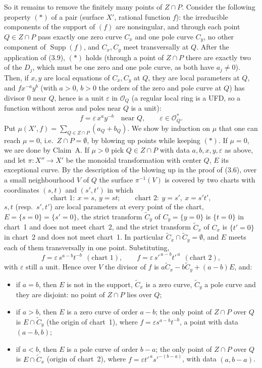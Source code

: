\documentclass[11pt]{article}
\begin{document}
So it remains to remove the finitely many points of $Z\cap P$. Consider the following property $(\ast)$ of a pair (surface $X'$, rational function $f$): the irreducible components of the support of $(f)$ are nonsingular, and through each point $Q\in Z\cap P$ pass exactly one zero curve $C_x$ and one pole curve $C_y$, no other component of $\operatorname{Supp}(f)$, and $C_x,C_y$ meet transversally at $Q$. After the application of (3.9), $(\ast)$ holds (through a point of $Z\cap P$ there are exactly two of the $D_j$, which must be one zero and one pole curve, as both have $a_j\ne 0$). Then, if $x,y$ are local equations of $C_x,C_y$ at $Q$, they are local parameters at $Q$, and $f x^{-a}y^{b}$ (with $a>0$, $b>0$ the orders of the zero and pole curve at $Q$) has divisor $0$ near $Q$, hence is a unit $\varepsilon$ in $\mathcal O_{Q}$ (a regular local ring is a UFD, so a function without zeros and poles near $Q$ is a unit):
\[
f=\varepsilon\,x^{a}y^{-b}\quad\text{near }Q,\qquad \varepsilon\in\mathcal O_{Q}^*.
\]
Put $\mu(X',f)=\sum_{Q\in Z\cap P}(a_Q+b_Q)$. We show by induction on $\mu$ that one can reach $\mu=0$, i.e.\ $Z\cap P=\emptyset$, by blowing up points while keeping $(\ast)$. If $\mu=0$, we are done by Claim~A. If $\mu>0$ pick $Q\in Z\cap P$ with data $a,b,x,y,\varepsilon$ as above, and let $\pi:X''\to X'$ be the monoidal transformation with center $Q$, $E$ its exceptional curve. By the description of the blowing up in the proof of (3.6), over a small neighbourhood $V$ of $Q$ the surface $\pi^{-1}(V)$ is covered by two charts with coordinates $(s,t)$ and $(s',t')$ in which
\[
\text{chart }1:\ x=s,\ y=st;\qquad \text{chart }2:\ y=s',\ x=s't' ,
\]
$s,t$ (resp.\ $s',t'$) are local parameters at every point of the chart, $E=\{s=0\}=\{s'=0\}$, the strict transform $\widetilde C_y$ of $C_y=\{y=0\}$ is $\{t=0\}$ in chart~1 and does not meet chart~2, and the strict transform $\widetilde C_x$ of $C_x$ is $\{t'=0\}$ in chart~2 and does not meet chart~1. In particular $\widetilde C_x\cap\widetilde C_y=\emptyset$, and $E$ meets each of them transversally in one point. Substituting,
\[
f=\varepsilon\, s^{a-b}t^{-b}\ \ (\text{chart 1}),\qquad f=\varepsilon\, s'^{\,a-b}t'^{\,a}\ \ (\text{chart 2}),
\]
with $\varepsilon$ still a unit. Hence over $V$ the divisor of $f$ is $a\widetilde C_x-b\widetilde C_y+(a-b)E$, and:
\begin{itemize}
\item if $a=b$, then $E$ is not in the support, $\widetilde C_x$ is a zero curve, $\widetilde C_y$ a pole curve and they are disjoint: no point of $Z\cap P$ lies over $Q$;
\item if $a>b$, then $E$ is a zero curve of order $a-b$; the only point of $Z\cap P$ over $Q$ is $E\cap\widetilde C_y$ (the origin of chart~1), where $f=\varepsilon s^{a-b}t^{-b}$, a point with data $(a-b,b)$;
\item if $a<b$, then $E$ is a pole curve of order $b-a$; the only point of $Z\cap P$ over $Q$ is $E\cap\widetilde C_x$ (origin of chart~2), where $f=\varepsilon t'^{\,a}s'^{-(b-a)}$, with data $(a,b-a)$.
\end{itemize}
\end{document}
